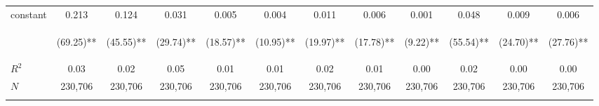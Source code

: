 \begin{tabular}{lccccccccccc}
\noalign{\smallskip}constant & 0.213 & 0.124 & 0.031 & 0.005 & 0.004 & 0.011 & 0.006 & 0.001 & 0.048 & 0.009 & 0.006\\
 & \begin{footnotesize}(69.25)**\end{footnotesize} & \begin{footnotesize}(45.55)**\end{footnotesize} & \begin{footnotesize}(29.74)**\end{footnotesize} & \begin{footnotesize}(18.57)**\end{footnotesize} & \begin{footnotesize}(10.95)**\end{footnotesize} & \begin{footnotesize}(19.97)**\end{footnotesize} & \begin{footnotesize}(17.78)**\end{footnotesize} & \begin{footnotesize}(9.22)**\end{footnotesize} & \begin{footnotesize}(55.54)**\end{footnotesize} & \begin{footnotesize}(24.70)**\end{footnotesize} & \begin{footnotesize}(27.76)**\end{footnotesize}\\
\noalign{\smallskip}$R^2$ & 0.03 & 0.02 & 0.05 & 0.01 & 0.01 & 0.02 & 0.01 & 0.00 & 0.02 & 0.00 & 0.00\\
$N$ & 230,706 & 230,706 & 230,706 & 230,706 & 230,706 & 230,706 & 230,706 & 230,706 & 230,706 & 230,706 & 230,706\\
\noalign{\smallskip}\bottomrule \end{tabular}
